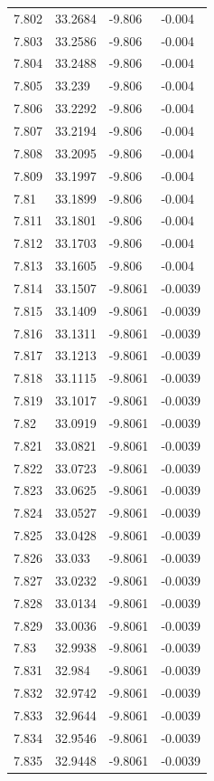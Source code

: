 \begin{tabular}{llll}
7.802 & 33.2684 & -9.806 & -0.004 \\
7.803 & 33.2586 & -9.806 & -0.004 \\
7.804 & 33.2488 & -9.806 & -0.004 \\
7.805 & 33.239 & -9.806 & -0.004 \\
7.806 & 33.2292 & -9.806 & -0.004 \\
7.807 & 33.2194 & -9.806 & -0.004 \\
7.808 & 33.2095 & -9.806 & -0.004 \\
7.809 & 33.1997 & -9.806 & -0.004 \\
7.81 & 33.1899 & -9.806 & -0.004 \\
7.811 & 33.1801 & -9.806 & -0.004 \\
7.812 & 33.1703 & -9.806 & -0.004 \\
7.813 & 33.1605 & -9.806 & -0.004 \\
7.814 & 33.1507 & -9.8061 & -0.0039 \\
7.815 & 33.1409 & -9.8061 & -0.0039 \\
7.816 & 33.1311 & -9.8061 & -0.0039 \\
7.817 & 33.1213 & -9.8061 & -0.0039 \\
7.818 & 33.1115 & -9.8061 & -0.0039 \\
7.819 & 33.1017 & -9.8061 & -0.0039 \\
7.82 & 33.0919 & -9.8061 & -0.0039 \\
7.821 & 33.0821 & -9.8061 & -0.0039 \\
7.822 & 33.0723 & -9.8061 & -0.0039 \\
7.823 & 33.0625 & -9.8061 & -0.0039 \\
7.824 & 33.0527 & -9.8061 & -0.0039 \\
7.825 & 33.0428 & -9.8061 & -0.0039 \\
7.826 & 33.033 & -9.8061 & -0.0039 \\
7.827 & 33.0232 & -9.8061 & -0.0039 \\
7.828 & 33.0134 & -9.8061 & -0.0039 \\
7.829 & 33.0036 & -9.8061 & -0.0039 \\
7.83 & 32.9938 & -9.8061 & -0.0039 \\
7.831 & 32.984 & -9.8061 & -0.0039 \\
7.832 & 32.9742 & -9.8061 & -0.0039 \\
7.833 & 32.9644 & -9.8061 & -0.0039 \\
7.834 & 32.9546 & -9.8061 & -0.0039 \\
7.835 & 32.9448 & -9.8061 & -0.0039 \\

\end{tabular}
